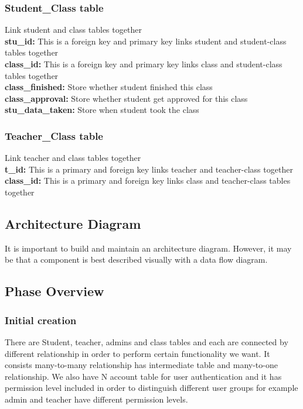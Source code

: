 \subsubsection{Student\_Class table}
Link student and class tables together\\
\textbf{stu\_id:} This is a foreign key and primary key links student and student-class tables together\\
\textbf{class\_id:} This is a foreign key and primary key links class and student-class tables together\\
\textbf{class\_finished:} Store whether student finished this class\\
\textbf{class\_approval:} Store whether student get approved for this class\\
\textbf{stu\_data\_taken:} Store when student took the class
\subsubsection{Teacher\_Class table}
Link teacher and class tables together\\
\textbf{t\_id:} This is a primary and foreign key links teacher and teacher-class together\\
\textbf{class\_id:} This is a primary and foreign key links class and teacher-class tables together


\subsection{ Architecture  Diagram}
It is important to build and maintain an architecture diagram.  However, it may 
be that a component is best described visually with a data flow diagram. 

\subsection{Phase Overview}

\subsubsection{Initial creation}
There are Student, teacher, admins and class tables and each are connected by different relationship in order to perform certain functionality we want. It consists many-to-many relationship has intermediate table and many-to-one relationship. We also have N account table for user authentication and it has permission level included in order to distinguish different user groups for example admin and teacher have different permission levels.\\

